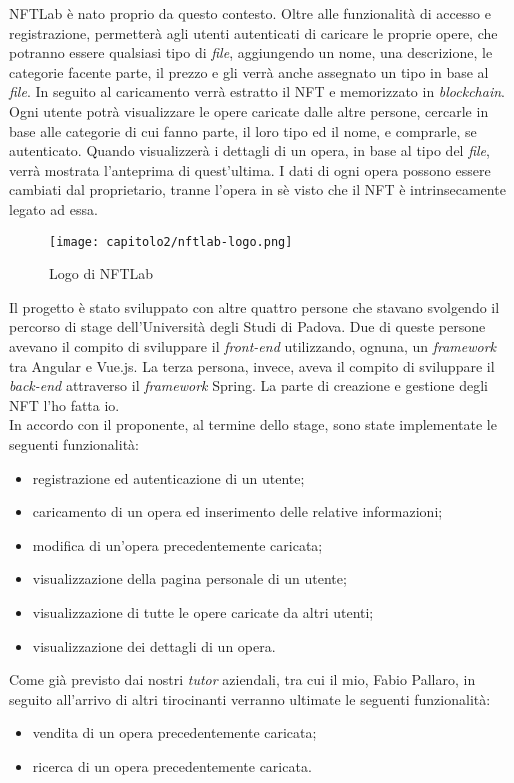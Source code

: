 NFTLab è nato proprio da questo contesto. Oltre alle funzionalità di accesso e registrazione, permetterà agli utenti autenticati di caricare le proprie opere, che potranno essere qualsiasi tipo di \textit{file}, aggiungendo un nome, una descrizione, le categorie facente parte, il prezzo e gli verrà anche assegnato un tipo in base al \textit{file}. In seguito al caricamento verrà estratto il NFT e memorizzato in \textit{blockchain}. 
Ogni utente potrà visualizzare le opere caricate dalle altre persone, cercarle in base alle categorie di cui fanno parte, il loro tipo ed il nome, e comprarle, se autenticato. Quando visualizzerà i dettagli di un opera, in base al tipo del \textit{file}, verrà mostrata l'anteprima di quest'ultima.
I dati di ogni opera possono essere cambiati dal proprietario, tranne l'opera in sè visto che il NFT è intrinsecamente legato ad essa.

\begin{figure}[!h]
  \centering
  \texttt{[image: capitolo2/nftlab-logo.png]}
  \caption{Logo di NFTLab}
\end{figure}

Il progetto è stato sviluppato con altre quattro persone che stavano svolgendo il percorso di stage dell'Università degli Studi di Padova. Due di queste persone avevano il compito di sviluppare il \textit{front-end} utilizzando, ognuna, un \textit{framework} tra Angular e Vue.js. La terza persona, invece, aveva il compito di sviluppare il \textit{back-end} attraverso il \textit{framework} Spring. La parte di creazione e gestione degli NFT l'ho fatta io. \\

\noindent In accordo con il proponente, al termine dello stage, sono state implementate le seguenti funzionalità:
\begin{itemize}
  \item registrazione ed autenticazione di un utente;
  \item caricamento di un opera ed inserimento delle relative informazioni;
  \item modifica di un'opera precedentemente caricata;
  \item visualizzazione della pagina personale di un utente;
  \item visualizzazione di tutte le opere caricate da altri utenti;
  \item visualizzazione dei dettagli di un opera.
\end{itemize}

\noindent Come già previsto dai nostri \textit{tutor} aziendali, tra cui il mio, Fabio Pallaro, in seguito all'arrivo di altri tirocinanti verranno ultimate le seguenti funzionalità:
\begin{itemize}
  \item vendita di un opera precedentemente caricata;
  \item ricerca di un opera precedentemente caricata.
\end{itemize}

